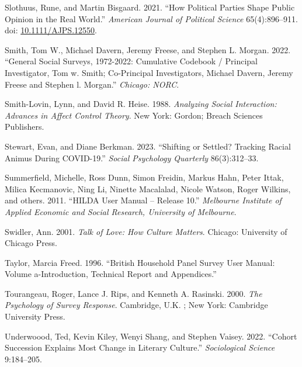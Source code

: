 \documentclass[
  12pt,
]{article}
\newlength{\cslhangindent}
\newlength{\cslentryspacingunit} %
\newenvironment{CSLReferences}[2] %
 {%
  \setlength{\parindent}{0pt}
  \ifodd #1
  \let\oldpar\par
  \def\par{\hangindent=\cslhangindent\oldpar}
  \fi
  \setlength{\parskip}{#2\cslentryspacingunit}
 }%
 {}
\begin{document}
\begin{CSLReferences}{1}{0}
\leavevmode{}%
Slothuus, Rune, and Martin Bisgaard. 2021. {``How {Political} {Parties}
{Shape} {Public} {Opinion} in the {Real} {World}.''} \emph{American
Journal of Political Science} 65(4):896--911. doi:
\href{https://doi.org/10.1111/AJPS.12550}{10.1111/AJPS.12550}.

\leavevmode{}%
Smith, Tom W., Michael Davern, Jeremy Freese, and Stephen L. Morgan.
2022. {``General Social Surveys, 1972-2022: Cumulative Codebook /
Principal Investigator, Tom w. Smith; Co-Principal Investigators,
Michael Davern, Jeremy Freese and Stephen l. Morgan.''} \emph{Chicago:
NORC}.

\leavevmode{}%
Smith-Lovin, Lynn, and David R. Heise. 1988. \emph{Analyzing {Social}
{Interaction}: {Advances} in {Affect} {Control} {Theory}}. New York:
Gordon; Breach Sciences Publishers.

\leavevmode{}%
Stewart, Evan, and Diane Berkman. 2023. {``Shifting or Settled? Tracking
Racial Animus During COVID-19.''} \emph{Social Psychology Quarterly}
86(3):312--33.

\leavevmode{}%
Summerfield, Michelle, Ross Dunn, Simon Freidin, Markus Hahn, Peter
Ittak, Milica Kecmanovic, Ning Li, Ninette Macalalad, Nicole Watson,
Roger Wilkins, and others. 2011. {``HILDA User Manual -- Release 10.''}
\emph{Melbourne Institute of Applied Economic and Social Research,
University of Melbourne}.

\leavevmode{}%
Swidler, Ann. 2001. \emph{Talk of {Love}: {How} {Culture} {Matters}}.
Chicago: University of Chicago Press.

\leavevmode{}%
Taylor, Marcia Freed. 1996. {``British Household Panel Survey User
Manual: Volume a-Introduction, Technical Report and Appendices.''}

\leavevmode{}%
Tourangeau, Roger, Lance J. Rips, and Kenneth A. Rasinski. 2000.
\emph{The Psychology of Survey Response}. Cambridge, U.K. ; New York:
Cambridge University Press.

\leavevmode{}%
Underwoood, Ted, Kevin Kiley, Wenyi Shang, and Stephen Vaisey. 2022.
{``Cohort Succession Explains Most Change in Literary Culture.''}
\emph{Sociological Science} 9:184--205.


\end{CSLReferences}
\end{document}
